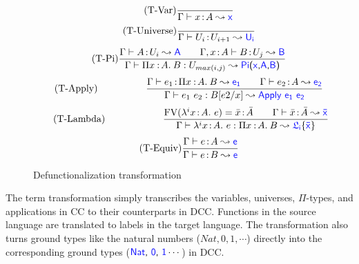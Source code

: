 \begin{figure}
	\begin{equation}
		\tag{T-Var}
		\frac
			{}
			{\Gamma \vdash x \goodcolon A \leadsto \target{x}}
	\end{equation} \hspace{0.5cm}
	\begin{equation}
		\tag{T-Universe}
		\frac
			{}
			{\Gamma \vdash U_i \goodcolon U_{i+1} \leadsto \target{U_i}}
	\end{equation} \hspace{0.5cm}
	\begin{equation}
		\tag{T-Pi}
		\frac
			{\Gamma \vdash A \goodcolon U_i \leadsto \target{A} \qquad \Gamma, x \goodcolon A \vdash B \goodcolon U_j \leadsto \target{B}
			}
			{\Gamma \vdash \pitype{x}{A}{B} \mathrel{:} U_{max(i, j)} \leadsto \targetpi{x}{A}{B}}
	\end{equation} \hspace{0.5cm}
	\begin{equation}
		\tag{T-Apply}
		\qquad\qquad\quad
		\frac
			{\Gamma \vdash e_1 \goodcolon \pitype{x}{A}{B} \leadsto \target{e_1} \qquad \Gamma \vdash e_2 \goodcolon A \leadsto \target{e_2}}
			{\Gamma \vdash e_1 \ e_2 \mathrel{:} B\sub{e2}{x} \leadsto \targetapp{e_1}{e_2}}
	\end{equation} \hspace{0.5cm}
	\begin{equation}
		\tag{T-Lambda}
		\qquad\qquad\qquad
		\frac
			{ \text{FV}(\lami{i}{x}{A}{e}) = \bar{x} \goodcolon \bar{A} \qquad \Gamma \vdash \bar{x} \goodcolon \bar{A} \leadsto \target{\bar{x}} }
			{ \Gamma \vdash \lami{i}{x}{A}{e} \mathrel{:} \pitype{x}{A}{B} \leadsto \target{\flabel_i}\{\target{\bar{x}}\}}
	\end{equation} \hspace{0.5cm}
	\begin{equation}
		\tag{T-Equiv}
		\frac
			{\Gamma \vdash e \goodcolon A \leadsto \target{e}}
			{\Gamma \vdash e \goodcolon B \leadsto \target{e}}
	\end{equation}
	\caption{Defunctionalization transformation}
    \label{fig:dcc transformation}
\end{figure}

The term transformation simply transcribes the variables, universes, $\Pi$-types, and applications in CC to their counterparts in DCC. Functions in the source language are translated to labels in the target language. The transformation also turns ground types like the natural numbers ($Nat, 0, 1, \cdots$) directly into the corresponding ground types ($\target{Nat}\sfcomma\target{0}\sfcomma\target{1}\cdots$) in DCC.


